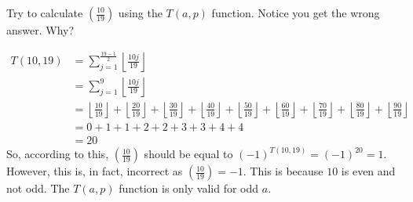 \documentclass{article}
\newcommand{\legendre}[2]{\left(\frac{#1}{#2}\right)}
\newcommand{\floor}[1]{\left\lfloor#1\right\rfloor}
\begin{document}

\begin{problem}{}{}
    Try to calculate $\legendre{10}{19}$ using the $T(a,p)$ function. Notice you get the wrong answer. Why?
\end{problem}
\begin{solution}{}{}
    \begin{align*}
        T(10,19)&=\sum_{j=1}^{\frac{19-1}{2}} \floor{\frac{10j}{19}}\\
        &=\sum_{j=1}^{9} \floor{\frac{10j}{19}}\\
        &=\floor{\frac{10}{19}}+\floor{\frac{20}{19}}+\floor{\frac{30}{19}}+\floor{\frac{40}{19}}+\floor{\frac{50}{19}}+\floor{\frac{60}{19}}+\floor{\frac{70}{19}}+\floor{\frac{80}{19}}+\floor{\frac{90}{19}}\\
        &=0+1+1+2+2+3+3+4+4\\
        &=20
    \end{align*}
    So, according to this, $\legendre{10}{19}$ should be equal to $(-1)^{T(10,19)}=(-1)^{20}=1$. However, this is, in fact, incorrect as $\legendre{10}{19}=-1$. This is because $10$ is even and not odd. The $T(a,p)$ function is only valid for odd $a$.
\end{solution}
\end{document}
